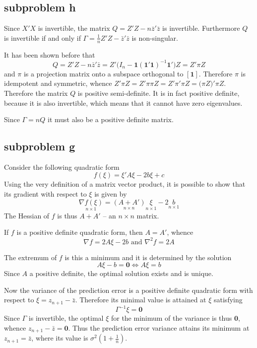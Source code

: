 \documentclass[a4paper]{article}
\newcommand{\clo}[1]{{\left [ #1 \right ]}}
\newcommand{\e}{\mathbf{1}}
\begin{document}

\subsection{subproblem h} %
\label{sub:subproblem_h}

Since $X'X$ is invertible, the matrix $Q = Z'Z - n \bar{z}'\bar{z}$ is
invertible. Furthermore $Q$ is invertible if and only if
$\Gamma = \frac{1}{n} Z'Z - \bar{z}'\bar{z}$ is non-singular.

It has been shown before that
\[Q = Z'Z - n \bar{z}'\bar{z} = Z'\big(I_n - \e(\e'\e)^{-1}\e'\big) Z = Z'\pi Z\]
and $\pi$ is a projection matrix onto a subspace orthogonal to $\clo{\e}$.
Therefore $\pi$ is idempotent and symmetric, whence $Z'\pi Z = Z'\pi \pi Z =
Z'\pi' \pi Z = \big(\pi Z\big)'\pi Z$. Therefore the matrix $Q$ is positive
semi-definite. It is in fact positive definite, because it is also invertible,
which means that it cannot have zero eigenvalues.

Since $\Gamma = n Q$ it must also be a positive definite matrix.


\subsection{subproblem g} %
\label{sub:subproblem_g}

Consider the following quadratic form
\[ f(\xi) =  \xi'A\xi - 2 b \xi + c\]
Using the very definition of a matrix vector product, it is possible to show
that its gradient with respect to $\xi$ is given by
\[\underset{n\times 1}{\nabla f(\xi)} = \underset{n\times n}{(A+A')} \underset{n\times 1}{\xi} - 2 \underset{n\times 1}{b}\]
The Hessian of $f$ is thus $A+A'$ -- an $n\times n$ matrix.

If $f$ is a positive definite quadratic form, then $A=A'$, whence 
\[\nabla f = 2 A\xi - 2 b \text{ and } \nabla^2 f = 2A\]

The extremum of $f$ is this a minimum and it is determined by the solution
\[ A\xi - b = \mathbf{0} \Leftrightarrow A\xi = b\]
Since $A$ a positive definite, the optimal solution exists and is unique.

Now the variance of the prediction error is a positive definite quadratic form
with respect to $\xi = z_{n+1} - \bar{z}$. Therefore its minimal value is
attained at $\xi$ satisfying
\[\Gamma^{-1} \xi = \mathbf{0}\]
Since $\Gamma$ is invertible, the optimal $\xi$ for the minimum of the
variance is thus $\mathbf{0}$, whence $z_{n+1} - \bar{z} = \mathbf{0}$. Thus
the prediction error variance attains its minimum at $z_{n+1} = \bar{z}$,
where its value is $\sigma^2(1+\frac{1}{n})$.
\end{document}
